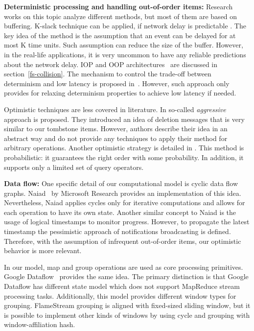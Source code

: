 
\label {fs-related-section}

{\bf Deterministic processing and handling out-of-order items:}
Research works on this topic analyze different methods, but most of them are based on buffering. K-slack technique can be applied, if network delay is predictable \cite{Babu:2004:EKC:1016028.1016032}. The key idea of the method is the assumption that an event can be delayed for at most K time units. Such assumption can reduce the size of the buffer. However, in the real-life applications, it is very uncommon to have any reliable predictions about the network delay. IOP and OOP architectures~\cite{Cranor:2003:GSD:872757.872838, Arasu:2006:CCQ:1146461.1146463, Li:2008:OPN:1453856.1453890} are discussed in section~\ref{fs-collision}. The mechanism to control the trade-off between determinism and low latency is proposed in~\cite{Zacheilas:2017:MDS:3093742.3093921}. However, such approach only provides for relaxing determinism properties to achieve low latency if needed.

Optimistic techniques are less covered in literature. In \cite{Wei:2009:SSO:1559845.1559973} so-called {\it aggressive} approach is proposed. They introduced an idea of deletion messages that is very similar to our tombstone items. However, authors describe their idea in an abstract way and do not provide any techniques to apply their method for arbitrary operations. Another optimistic strategy is detailed in \cite{Li2011}. This method is probabilistic: it guarantees the right order with some probability. In addition, it supports only a limited set of query operators.

{\bf Data flow:}
One specific detail of our computational model is cyclic data flow graphs. Naiad~\cite{Murray:2013:NTD:2517349.2522738} by Microsoft Research provides an implementation of this idea. Nevertheless, Naiad applies cycles only for iterative computations and allows for each operation to have its own state. Another similar concept to Naiad is the usage of logical timestamps to monitor progress. However, to propagate the latest timestamp the pessimistic approach of notifications broadcasting is defined. Therefore, with the assumption of infrequent out-of-order items, our optimistic behavior is more relevant.

In our model, map and group operations are used as core processing primitives. Google Dataflow~\cite{Akidau:2015:DMP:2824032.2824076} provides the same idea. The primary distinction is that Google Dataflow has different state model which does not support MapReduce stream processing tasks. Additionally, this model provides different window types for grouping. FlameStream grouping is aligned with fixed-sized sliding window, but it is possible to implement other kinds of windows by using cycle and grouping with window-affiliation hash.
